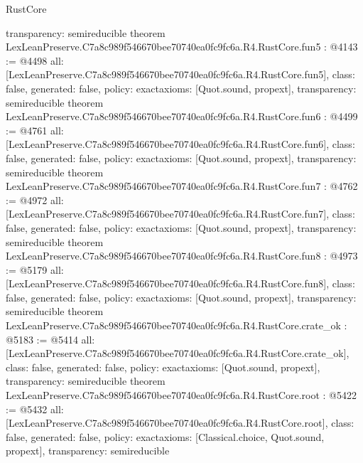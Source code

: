 \begin{lexlean}{RustCore}
\begin{coremodule}
{  transparency: semireducible
}
theorem LexLeanPreserve.C7a8c989f546670bee70740ea0fc9fc6a.R4.RustCore.fun5 : @4143 := @4498 {
  all: [LexLeanPreserve.C7a8c989f546670bee70740ea0fc9fc6a.R4.RustCore.fun5],
  class: false,
  generated: false,
  policy: exact{axioms: [Quot.sound, propext]},
  transparency: semireducible
}
theorem LexLeanPreserve.C7a8c989f546670bee70740ea0fc9fc6a.R4.RustCore.fun6 : @4499 := @4761 {
  all: [LexLeanPreserve.C7a8c989f546670bee70740ea0fc9fc6a.R4.RustCore.fun6],
  class: false,
  generated: false,
  policy: exact{axioms: [Quot.sound, propext]},
  transparency: semireducible
}
theorem LexLeanPreserve.C7a8c989f546670bee70740ea0fc9fc6a.R4.RustCore.fun7 : @4762 := @4972 {
  all: [LexLeanPreserve.C7a8c989f546670bee70740ea0fc9fc6a.R4.RustCore.fun7],
  class: false,
  generated: false,
  policy: exact{axioms: [Quot.sound, propext]},
  transparency: semireducible
}
theorem LexLeanPreserve.C7a8c989f546670bee70740ea0fc9fc6a.R4.RustCore.fun8 : @4973 := @5179 {
  all: [LexLeanPreserve.C7a8c989f546670bee70740ea0fc9fc6a.R4.RustCore.fun8],
  class: false,
  generated: false,
  policy: exact{axioms: [Quot.sound, propext]},
  transparency: semireducible
}
theorem LexLeanPreserve.C7a8c989f546670bee70740ea0fc9fc6a.R4.RustCore.crate_ok : @5183 := @5414 {
  all: [LexLeanPreserve.C7a8c989f546670bee70740ea0fc9fc6a.R4.RustCore.crate_ok],
  class: false,
  generated: false,
  policy: exact{axioms: [Quot.sound, propext]},
  transparency: semireducible
}
theorem LexLeanPreserve.C7a8c989f546670bee70740ea0fc9fc6a.R4.RustCore.root : @5422 := @5432 {
  all: [LexLeanPreserve.C7a8c989f546670bee70740ea0fc9fc6a.R4.RustCore.root],
  class: false,
  generated: false,
  policy: exact{axioms: [Classical.choice, Quot.sound, propext]},
  transparency: semireducible
}


\end{coremodule}
\end{lexlean}
